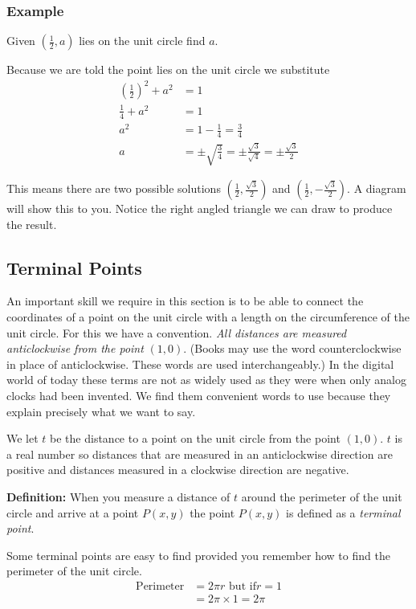 \subsubsection{Example}
Given $\left (\frac{1}{2} ,a\right )$ lies on the unit circle find $a$. 

Because we are told the point lies on the unit circle we substitute
\begin{align*}\genfrac{(}{)}{}{}{1}{2}^{2} +a^{2} &  = 1 \\
	\frac{1}{4} +a^{2} &  = 1 \\
	a^{2} &  = 1 -\frac{1}{4} =\frac{3}{4} \\
	a &  =  \pm \sqrt{\frac{3}{4}} = \pm \frac{\sqrt{3}}{\sqrt{4}} = \pm \frac{\sqrt{3}}{2}\end{align*}

This means there are two possible solutions $\left (\frac{1}{2} ,\frac{\sqrt{3}}{2}\right )$ and $\left (\frac{1}{2} , -\frac{\sqrt{3}}{2}\right )$. A diagram will show
this to you. Notice the right angled triangle we can draw to produce the result. 


\subsection{Terminal Points}
An important skill we require in this section is to be able to connect the coordinates of a point on the unit circle with a length on the circumference
of the unit circle. For this we have a convention. \emph{All
	distances are measured anticlockwise from the point }$\left (1 ,0\right )$. (Books may use
the word counterclockwise in place of anticlockwise. These words are used interchangeably.) In
the digital world of today these terms are not as widely used as they were when only analog clocks had been invented. We
find them convenient words to use because they explain precisely what we want to say. 

We let $t$ be the distance to a point on the unit circle from the point $\left (1 ,0\right )$. $t$ is a real number so distances that are measured in an anticlockwise direction are positive and distances measured in a clockwise
direction are negative. 

\textbf{Definition:} When you measure a distance of $t$ around the perimeter of the unit circle and arrive at a point $P (x ,y)$ the point $P (x ,y)$ is defined as a \emph{terminal point}.

Some terminal points are easy to find provided you remember how to find the perimeter of the unit circle.
\begin{align*}\text{Perimeter} &  = 2 \pi  r\text{\  but if}r =1 \\
	&  = 2 \pi  \times 1 =2 \pi \end{align*}

